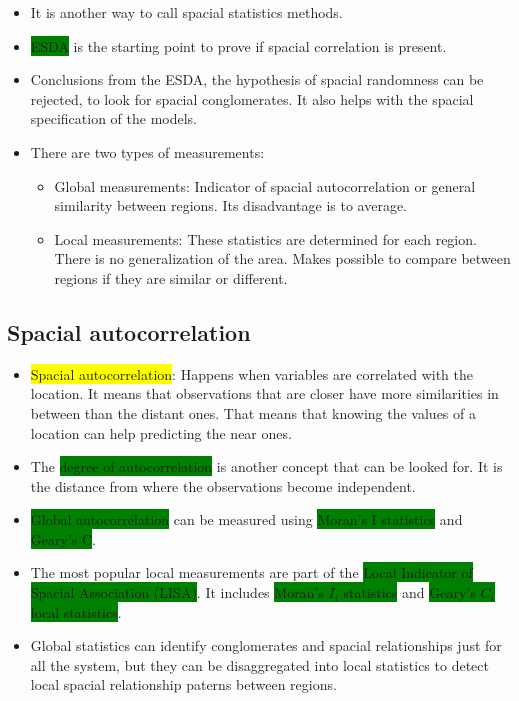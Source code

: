 \documentclass[
]{book}
\newcommand{\defi}[1]{\colorbox{yellow}{#1}}
\newcommand{\key}[1]{\colorbox{green}{#1}}
\theoremstyle{definition}
\theoremstyle{definition}
\theoremstyle{definition}
\theoremstyle{definition}
\theoremstyle{remark}
\begin{document}
\begin{itemize}
\item
  It is another way to call spacial statistics methods.
\item
  \key{ESDA} is the starting point to prove if spacial correlation is present.
\item
  Conclusions from the ESDA, the hypothesis of spacial randomness can be rejected, to look for spacial conglomerates. It also helps with the spacial specification of the models.
\item
  There are two types of measurements:

  \begin{itemize}
  \item
    Global measurements: Indicator of spacial autocorrelation or general similarity between regions. Its disadvantage is to average.
  \item
    Local measurements: These statistics are determined for each region. There is no generalization of the area. Makes possible to compare between regions if they are similar or different.
  \end{itemize}
\end{itemize}

\subsection*{Spacial autocorrelation}\label{spacial-autocorrelation}

\begin{itemize}
\item
  \defi{Spacial autocorrelation}: Happens when variables are correlated with the location. It means that observations that are closer have more similarities in between than the distant ones. That means that knowing the values of a location can help predicting the near ones.
\item
  The \key{degree of autocorrelation} is another concept that can be looked for. It is the distance from where the observations become independent.
\item
  \key{Global autocorrelation} can be measured using \key{Moran's I statistics} and \key{Geary's C}.
\item
  The most popular local measurements are part of the \key{Local Indicator of Spacial Association (LISA)}. It includes \key{Moran's $I_i$ statistics} and \key{Geary's $C_i$ local statistics}.
\item
  Global statistics can identify conglomerates and spacial relationships just for all the system, but they can be disaggregated into local statistics to detect local spacial relationship paterns between regions.
\end{itemize}
\end{document}
